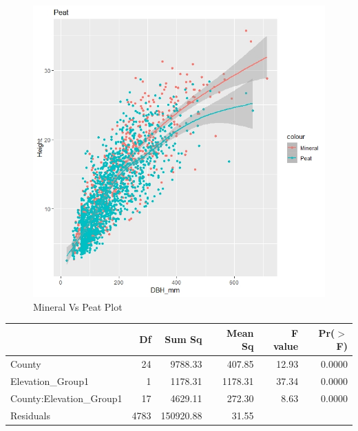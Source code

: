 \documentclass[a4paper,11pt,twoside]{report}
\begin{document}
\begin{figure}[hb]
  \centering
  \includegraphics[width=.8\linewidth]{SoilPlot.jpeg}
   \caption{Mineral Vs Peat Plot}
  \label{fig:Mineral vs Peat}
  \end{figure}
  



\begin{table}[th]
\centering
\begin{tabular}{lrrrrr}
  \hline
 & Df & Sum Sq & Mean Sq & F value & Pr($>$F) \\ 
  \hline
County & 24 & 9788.33 & 407.85 & 12.93 & 0.0000 \\ 
  Elevation\_Group1 & 1 & 1178.31 & 1178.31 & 37.34 & 0.0000 \\ 
  County:Elevation\_Group1 & 17 & 4629.11 & 272.30 & 8.63 & 0.0000 \\ 
  Residuals & 4783 & 150920.88 & 31.55 &  &  \\ 
   \hline
\end{tabular}
\end{table}
\end{document}
